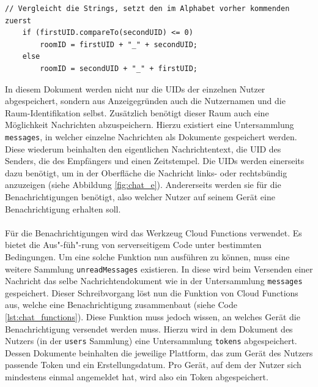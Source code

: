 \begin{lstlisting}[caption=Sortierung der UIDs, label=lst:chat_uid_sorting]
	// Vergleicht die Strings, setzt den im Alphabet vorher kommenden zuerst
	if (firstUID.compareTo(secondUID) <= 0)
		roomID = firstUID + "_" + secondUID;
	else
		roomID = secondUID + "_" + firstUID;
\end{lstlisting}

In diesem Dokument werden nicht nur die UIDs der einzelnen Nutzer abgespeichert, sondern aus Anzeigegründen auch die Nutzernamen und die Raum-Identifikation selbst.
Zusätzlich benötigt dieser Raum auch eine Möglichkeit Nachrichten abzuspeichern.
Hierzu existiert eine Untersammlung \texttt{messages}, in welcher einzelne Nachrichten als Dokumente gespeichert werden.
Diese wiederum beinhalten den eigentlichen Nachrichtentext, die UID des Senders, die des Empfängers und einen Zeitstempel.
Die UIDs werden einerseits dazu benötigt, um in der Oberfläche die Nachricht links- oder rechtsbündig anzuzeigen (siehe Abbildung \ref{fig:chat_e}).
Andererseits werden sie für die Benachrichtigungen benötigt, also welcher Nutzer auf seinem Gerät eine Benachrichtigung erhalten soll.\\
\\
Für die Benachrichtigungen wird das Werkzeug Cloud Functions verwendet.
Es bietet die Aus"-füh"-rung von serverseitigem Code unter bestimmten Bedingungen.
Um eine solche Funktion nun ausführen zu können, muss eine weitere Sammlung \texttt{unreadMessages} existieren.
In diese wird beim Versenden einer Nachricht das selbe Nachrichtendokument wie in der Untersammlung \texttt{messages} gespeichert.
Dieser Schreibvorgang löst nun die Funktion von Cloud Functions aus, welche eine Benachrichtigung zusammenbaut (siehe Code \ref{lst:chat_functions}).
Diese Funktion muss jedoch wissen, an welches Gerät die Benachrichtigung versendet werden muss.
Hierzu wird in dem Dokument des Nutzers (in der \texttt{users} Sammlung) eine Untersammlung \texttt{tokens} abgespeichert.
Dessen Dokumente beinhalten die jeweilige Plattform, das zum Gerät des Nutzers passende Token und ein Erstellungsdatum.
Pro Gerät, auf dem der Nutzer sich mindestens einmal angemeldet hat, wird also ein Token abgespeichert.\\

